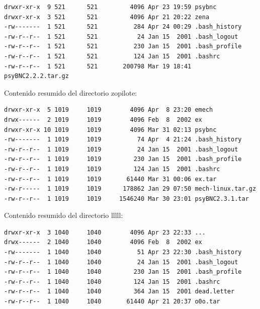 \vspace{1em}

\begin{lstlisting}[style=terminal]
drwxr-xr-x  9 521      521         4096 Apr 23 19:59 psybnc
drwxr-xr-x  3 521      521         4096 Apr 21 20:22 zena
-rw-------  1 521      521          284 Apr 24 00:29 .bash_history
-rw-r--r--  1 521      521           24 Jan 15  2001 .bash_logout
-rw-r--r--  1 521      521          230 Jan 15  2001 .bash_profile
-rw-r--r--  1 521      521          124 Jan 15  2001 .bashrc
-rw-r--r--  1 521      521       200798 Mar 19 18:41 psyBNC2.2.2.tar.gz
\end{lstlisting}

\vspace{1em}

 Contenido resumido del directorio zopilote:
 
\vspace{1em}

\begin{lstlisting}[style=terminal]
drwxr-xr-x  5 1019     1019        4096 Apr  8 23:20 emech
drwx------  2 1019     1019        4096 Feb  8  2002 ex
drwxr-xr-x 10 1019     1019        4096 Mar 31 02:13 psybnc
-rw-------  1 1019     1019          74 Apr  4 21:24 .bash_history
-rw-r--r--  1 1019     1019          24 Jan 15  2001 .bash_logout
-rw-r--r--  1 1019     1019         230 Jan 15  2001 .bash_profile
-rw-r--r--  1 1019     1019         124 Jan 15  2001 .bashrc
-rw-r--r--  1 1019     1019       61440 Mar 31 00:06 ex.tar
-rw-r-----  1 1019     1019      178862 Jan 29 07:50 mech-linux.tar.gz
-rw-r--r--  1 1019     1019     1546240 Mar 30 23:01 psyBNC2.3.1.tar
\end{lstlisting}

\vspace{1em}

 Contenido resumido del directorio lllll:
 
\vspace{1em}

\begin{lstlisting}[style=terminal]
drwxr-xr-x  3 1040     1040        4096 Apr 23 22:33 ...
drwx------  2 1040     1040        4096 Feb  8  2002 ex
-rw-------  1 1040     1040          51 Apr 23 22:30 .bash_history
-rw-r--r--  1 1040     1040          24 Jan 15  2001 .bash_logout
-rw-r--r--  1 1040     1040         230 Jan 15  2001 .bash_profile
-rw-r--r--  1 1040     1040         124 Jan 15  2001 .bashrc
-rw-r--r--  1 1040     1040         364 Jan 15  2001 dead.letter
-rw-r--r--  1 1040     1040       61440 Apr 21 20:37 o0o.tar
\end{lstlisting}

